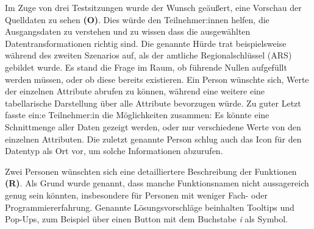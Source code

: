 Im Zuge von drei Testsitzungen wurde der Wunsch geäußert, eine Vorschau der Quelldaten zu sehen \textbf{(O)}. Dies würde den Teilnehmer:innen helfen, die Ausgangsdaten zu verstehen und zu wissen dass die ausgewählten Datentransformationen richtig sind. Die genannte Hürde trat beispielsweise während des zweiten Szenarios auf, als der amtliche Regionalschlüssel (\acs{ARS}) gebildet wurde. Es stand die Frage im Raum, ob führende Nullen aufgefüllt werden müssen, oder ob diese bereits existieren. Ein Person wünschte sich, Werte der einzelnen Attribute abrufen zu können, während eine weitere eine tabellarische Darstellung über alle Attribute bevorzugen würde. Zu guter Letzt fasste ein:e Teilnehmer:in die Möglichkeiten zusammen: Es könnte eine Schnittmenge aller Daten gezeigt werden, oder nur verschiedene Werte von den einzelnen Attributen. Die zuletzt genannte Person schlug auch das Icon für den Datentyp als Ort vor, um solche Informationen abzurufen.

Zwei Personen wünschten sich eine detailliertere Beschreibung der Funktionen \textbf{(R)}. Als Grund wurde genannt, dass manche Funktionsnamen nicht aussagereich genug sein könnten, insbesondere für Personen mit weniger Fach- oder Programmiererfahrung. Genannte Lösungsvorschläge beinhalten Tooltips und Pop-Ups, zum Beispiel über einen Button mit dem Buchstabe \textit{i} als Symbol.

